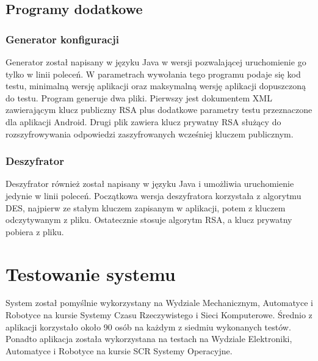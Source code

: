 \documentclass{report}
\begin{document}
	\section{Programy dodatkowe}
		
		\subsection{Generator konfiguracji}
		
		Generator został napisany w języku Java w wersji pozwalającej uruchomienie go tylko w linii poleceń. W parametrach wywołania tego programu podaje się kod testu, minimalną wersję aplikacji oraz maksymalną wersję aplikacji dopuszczoną do testu. Program generuje dwa pliki. Pierwszy jest dokumentem XML zawierającym klucz publiczny RSA plus dodatkowe parametry testu przeznaczone dla aplikacji Android. Drugi plik zawiera klucz prywatny RSA służący do rozszyfrowywania odpowiedzi zaszyfrowanych wcześniej kluczem publicznym.
		
		\subsection{Deszyfrator}
		
		Deszyfrator również został napisany w języku Java i umożliwia uruchomienie jedynie w linii poleceń. Początkowa wersja deszyfratora korzystała z algorytmu DES, najpierw ze stałym kluczem zapisanym w aplikacji, potem z kluczem odczytywanym z pliku. Ostatecznie stosuje algorytm RSA, a klucz prywatny pobiera z pliku.
		

	\chapter{Testowanie systemu}
	
	System został pomyślnie wykorzystany na Wydziale Mechanicznym, Automatyce i Robotyce na kursie Systemy Czasu Rzeczywistego i Sieci Komputerowe. Średnio z aplikacji korzystało około 90 osób na każdym z siedmiu wykonanych testów. Ponadto aplikacja została wykorzystana na testach na Wydziale Elektroniki, Automatyce i Robotyce na kursie SCR Systemy Operacyjne.
		
			
\end{document}
